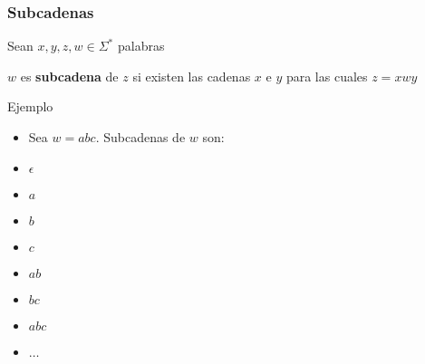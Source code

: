 \begin{frame}
  \frametitle{Subcadenas}
      Sean $x, y, z, w \in \Sigma^*$ palabras
      \begin{defi}
			$w$ es \textbf{subcadena} de $z$ si existen las cadenas $x$ e $y$ para las cuales $z = xwy$
      \end{defi}
      \pause

      \begin{block}{Ejemplo}
           \begin{itemize}[<+->]
           \item Sea $w = abc$. Subcadenas de $w$ son:
					 \item $\epsilon$
					 \item $a$
					 \item $b$
					 \item $c$
					 \item $ab$
					 \item $bc$
					 \item $abc$
					 \item $\ldots$
           \end{itemize}
			\end{block}
\end{frame}
